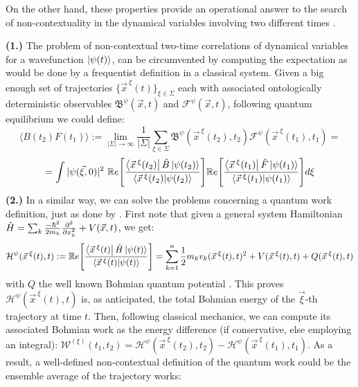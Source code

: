\documentclass[11pt, a4paper]{article} %
\newcommand{\B}{\mathfrak{B}}
\begin{document}
On the other hand, these properties provide an operational answer to the search of non-contextuality in the dynamical variables involving two different times \cite{DevInPosition1}. %

{\bf (1.)} The problem of non-contextual two-time correlations of dynamical variables for a wavefunction $\ket{\psi(t)}$, can be circumvented by computing the expectation as would be done by a frequentist definition in a classical system. Given a big enough set of trajectories $\{\vec{x}^{\:\xi}(t)\}_{\xi\in \Sigma}$ each with associated ontologically deterministic observables $\B^\psi(\vec{x},t)$ and $\mathcal{F}^\psi(\vec{x},t)$, following quantum equilibrium \cite{Absolute} we could define:\vspace{-0.2cm}
\begin{equation}
\langle B(t_2)F(t_1)\rangle := \lim_{|\Sigma|\rightarrow \infty}\frac{1}{|\Sigma|} \sum_{\xi\in\Sigma} \B^\psi(\vec{x}^{\:\xi}(t_2),t_2)\mathcal{F}^\psi(\vec{x}^{\:\xi}(t_1),t_1) =
\end{equation}
$$
=  \int |\psi(\vec{\xi},0)|^2\ \mathbb{R}e\qty[ \frac{\bra{\vec{x}^{\:\xi}(t_2)}\hat{B}\ket{\psi(t_2)}}{\bra{\vec{x}^{\:\xi}(t_2)}\ket{\psi(t_2)}} ] \mathbb{R}e\qty[ \frac{\bra{\vec{x}^{\:\xi}(t_1)}\hat{F}\ket{\psi(t_1)}}{\bra{\vec{x}^{\:\xi}(t_1)}\ket{\psi(t_1)}} ]d\xi
$$
{\bf (2.) } In a similar way, we can solve the problems concerning a quantum work definition, just as done by \cite{work1, work2}. First note that given a general system Hamiltonian $\hat{H}=\sum_k \frac{-\hbar^2}{2m_k}\pdv[2]{}{x_k}+V(\vec{x},t)$, we get:
\begin{equation}
\mathcal{H}^\psi(\vec{x}^{\:\xi}(t),t) := \mathbb{R}e\qty[ \frac{\bra{\vec{x}^{\:\xi}(t)}\hat{H}\ket{\psi(t)}}{\bra{\vec{x}^{\:\xi}(t)}\ket{\psi(t)}} ] = \sum_{k=1}^n\frac{1}{2}m_kv_k(\vec{x}^{\:\xi}(t),t)^2+V(\vec{x}^{\:\xi}(t),t)+Q(\vec{x}^{\:\xi}(t),t)
\end{equation}
with $Q$ the well known Bohmian quantum potential \cite{Holland, Durr, JordiXavier}. This proves $\mathcal{H}^\psi(\vec{x}^{\:\xi}(t),t)$ is, as anticipated, the total Bohmian energy of the $\vec{\xi}$-th trajectory at time $t$. Then, following classical mechanics, we can compute its associated Bohmian work as the energy difference (if conservative, else employing an integral): $\mathcal{W}^{(\xi)}(t_1,t_2)= \mathcal{H}^\psi(\vec{x}^{\:\xi}(t_2),t_2)-\mathcal{H}^\psi(\vec{x}^{\:\xi}(t_1),t_1)$. As a result, a well-defined non-contextual definition of the quantum work could be the ensemble average of the trajectory works:
\end{document}
